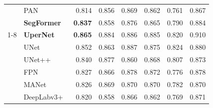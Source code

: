 \begin{table}
\begin{tabular}{llrrrrrr}
		                         & PAN~\cite{DBLP:journals/corr/abs-1805-10180}              & 0.814                             & 0.856                                  & 0.869                               & 0.862                                 & 0.761                               & 0.867                               \\
		                         & \textbf{SegFormer}~\cite{xie2021segformer}                & \textbf{0.837}                    & 0.858                                  & 0.876                               & 0.865                                 & 0.790                               & 0.884                               \\
		\cmidrule{1-8}
		\multirow{8}{*}{SS-JEPA} & \textbf{UperNet}~\cite{DBLP:journals/corr/abs-1807-10221} & \textbf{0.865}                    & 0.884                                  & 0.886                               & 0.885                                 & 0.820                               & 0.910                               \\
		                         & UNet~\cite{ronneberger2015unet}                           & 0.852                             & 0.863                                  & 0.887                               & 0.875                                 & 0.824                               & 0.880                               \\
		                         & UNet++~\cite{zhou2019unetplusplus}                        & 0.840                             & 0.877                                  & 0.860                               & 0.868                                 & 0.807                               & 0.873                               \\
		                         & FPN~\cite{DBLP:journals/corr/LinDGHHB16}                  & 0.827                             & 0.866                                  & 0.878                               & 0.872                                 & 0.776                               & 0.878                               \\
		                         & MANet~\cite{Li_2022}                                      & 0.826                             & 0.869                                  & 0.870                               & 0.870                                 & 0.782                               & 0.870                               \\
		                         & DeepLabv3+~\cite{DBLP:journals/corr/abs-1802-02611}       & 0.820                             & 0.858                                  & 0.866                               & 0.862                                 & 0.769                               & 0.871                               \\

\end{tabular}
\end{table}

